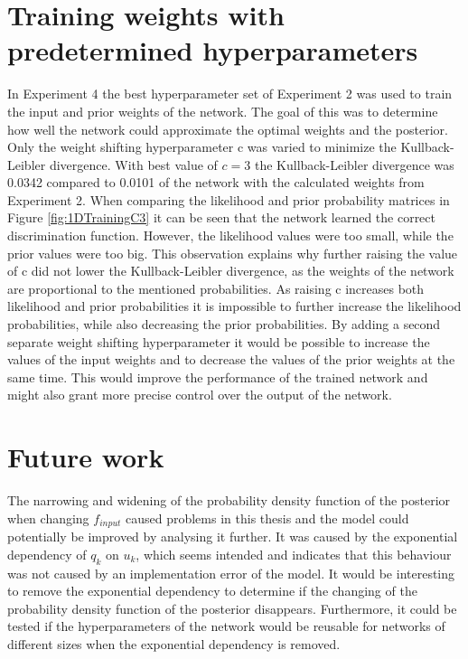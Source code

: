 \section{Training weights with predetermined hyperparameters}
In Experiment 4 the best hyperparameter set of Experiment 2 was used to train the input and prior weights of the network. The goal of this was to determine how well the network could approximate the optimal weights and the posterior. Only the weight shifting hyperparameter c was varied to minimize the Kullback-Leibler divergence. With best value of $c = 3$ the Kullback-Leibler divergence was 0.0342 compared to 0.0101 of the network with the calculated weights from Experiment 2. When comparing the likelihood and prior probability matrices in Figure \ref{fig:1DTrainingC3} it can be seen that the network learned the correct discrimination function. However, the likelihood values were too small, while the prior values were too big. This observation explains why further raising the value of c did not lower the Kullback-Leibler divergence, as the weights of the network are proportional to the mentioned probabilities. As raising c increases both likelihood and prior probabilities it is impossible to further increase the likelihood probabilities, while also decreasing the prior probabilities. By adding a second separate weight shifting hyperparameter it would be possible to increase the values of the input weights and to decrease the values of the prior weights at the same time. This would improve the performance of the trained network and might also grant more precise control over the output of the network.

\section{Future work}
The narrowing and widening of the probability density function of the posterior when changing $f_{input}$ caused problems in this thesis and the model could potentially be improved by analysing it further. It was caused by the exponential dependency of $q_k$ on $u_k$, which seems intended and indicates that this behaviour was not caused by an implementation error of the model. It would be interesting to remove the exponential dependency to determine if the changing of the probability density function of the posterior disappears. Furthermore, it could be tested if the hyperparameters of the network would be reusable for networks of different sizes when the exponential dependency is removed.

